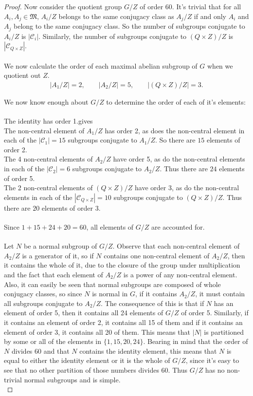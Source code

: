 \begin{proof}
Now consider the quotient group $G / Z$ of order 60. It's trivial that for all $A_i, A_j \in \mathfrak{M}$, $A_i / Z$ belongs to the same conjugacy class as $A_j / Z$ if and only $A_i$ and $A_j$ belong to the same conjugacy class. So the number of subgroups conjugate to $A_i / Z$ is $|\mathcal{C}_i|$. Similarly, the number of subgroups conjugate to $(Q\times Z) / Z$ is $|\mathcal{C}_{Q \times Z}|$. \\
\\
We now calculate the order of each maximal abelian subgroup of $G$ when we quotient out $Z$.
\begin{align*} |A_1 / Z| = 2, \qquad |A_2 / Z| = 5, \qquad |(Q \times Z) / Z| = 3.
\end{align*}

We now know enough about $G / Z$ to determine the order of each of it's elements: \\
\\
 \space The identity has order 1.gives \\
 \space The non-central element of $A_1 / Z$ has order 2, as does the non-central element in each of the $|\mathcal{C}_1| = 15$ subgroups conjugate to $A_1 / Z$. So there are $15$ elements of order 2. \\
 \space The 4 non-central elements of $A_2 / Z$ have order 5, as do the non-central elements in each of the $|\mathcal{C}_2| = 6$ subgroups conjugate to $A_2 / Z$. Thus there are $24$ elements of order 5. \\
 \space  The 2 non-central elements of $(Q \times Z) / Z$ have order 3, as do the non-central elements in each of the $|\mathcal{C}_{Q \times Z}| = 10$ subgroups conjugate to $(Q \times Z) / Z$. Thus there are $20$ elements of order 3. \\
\\
Since $1+15+24+20=60$, all elements of $G / Z$ are accounted for. \\
\\
Let $N$ be a normal subgroup of $G / Z$. Observe that each non-central element of $A_2 / Z$ is a generator of it, so if $N$ contains one non-central element of $A_2 / Z$, then it contains the whole of it, due to the closure of the group under multiplication and the fact that each element of $A_2 / Z$ is a power of any non-central element. Also, it can easily be seen that normal subgroups are composed of whole conjugacy classes, so since $N$ is normal in $G$, if it contains $A_2 / Z$, it must contain all subgroups conjugate to $A_2 / Z$. The consequence of this is that if $N$ has an element of order 5, then it contains all 24 elements of $G / Z$ of order 5. Similarly, if it contains an element of order 2, it contains all 15 of them and if it contains an element of order 3, it contains all 20 of them. This means that $|N|$ is partitioned by some or all of the elements in $\{ 1, 15, 20, 24 \}$. Bearing in mind that the order of $N$ divides 60 and that $N$ contains the identity element, this means that $N$ is equal to either the identity element or it is the whole of $G / Z$, since it's easy to see that no other partition of those numbers divides 60. Thus $G / Z$ has no non-trivial normal subgroups and is simple. \\

\end{proof}
